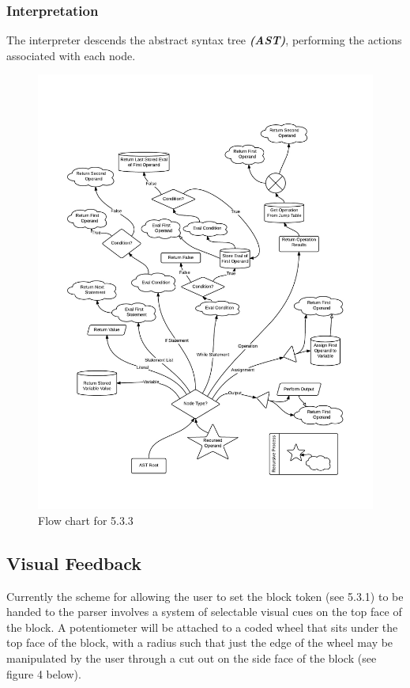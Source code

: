    \subsubsection{Interpretation}
      The interpreter descends the abstract syntax tree \textit{\textbf{(AST)}}, performing the actions associated with each node.
 \begin{figure}[H]
   \centering
 \includegraphics[width=5.25in]{central_processor_interpreter}
    \caption{Flow chart for 5.3.3}
   \end{figure}
\subsection{ Visual Feedback}
Currently the scheme for allowing the user to set the  block token (see 5.3.1) to be handed to the parser involves a system of selectable visual cues on the top face of the block. A potentiometer will be attached to a coded wheel that sits under the top face of the block, with a radius such that just the edge of the wheel may be manipulated by the user through a cut out on the side face of the block (see figure 4 below).

